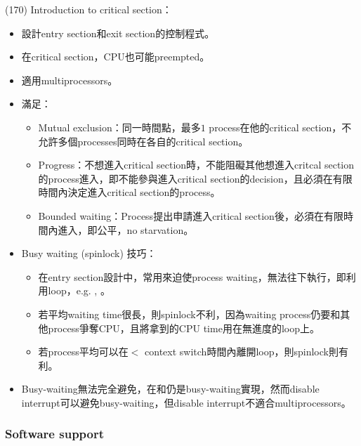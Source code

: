 \begin{theorem}{(170)} Introduction to critical section： \begin{itemize}
        \item 設計entry section和exit section的控制程式。
        \item 在critical section，CPU也可能preempted。
        \item 適用multiprocessors。
        \item 滿足：\begin{itemize}
            \item Mutual exclusion：同一時間點，最多$1$ process在他的critical section，不允許多個processes同時在各自的critical section。
            \item Progress：不想進入critical section時，不能阻礙其他想進入critcal section的process進入，即不能參與進入critical section的decision，且必須在有限時間內決定進入critical section的process。
            \item Bounded waiting：Process提出申請進入critical section後，必須在有限時間內進入，即公平，no starvation。
        \end{itemize}
        \item Busy waiting (spinlock) 技巧：\begin{itemize}
            \item 在entry section設計中，常用來迫使process waiting，無法往下執行，即利用loop，e.g. , 。
            \item 若平均waiting time很長，則spinlock不利，因為waiting process仍要和其他process爭奪CPU，且將拿到的CPU time用在無進度的loop上。
            \item 若process平均可以在$<$ context switch時間內離開loop，則spinlock則有利。
        \end{itemize}
        \item Busy-waiting無法完全避免，在和仍是busy-waiting實現，然而disable interrupt可以避免busy-waiting，但disable interrupt不適合multiprocessors。
    \end{itemize}
\end{theorem}

\subsubsection{Software support}

